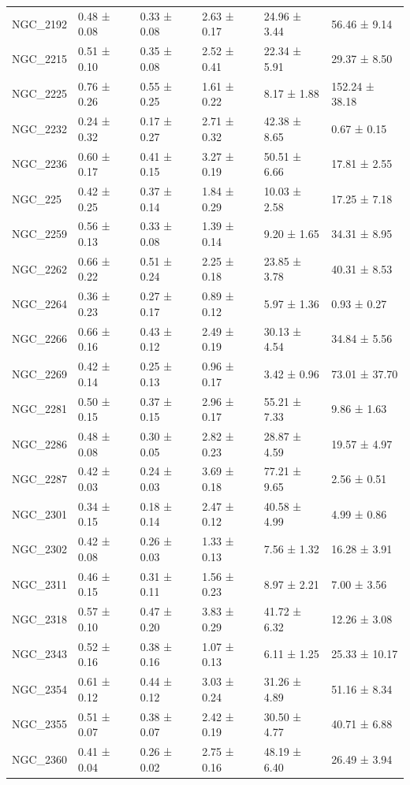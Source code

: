 \begin{tabular}{llllll}
NGC_2192 & 0.48 ± 0.08 & 0.33 ± 0.08 & 2.63 ± 0.17 & 24.96 ± 3.44 & 56.46 ± 9.14 \\
NGC_2215 & 0.51 ± 0.10 & 0.35 ± 0.08 & 2.52 ± 0.41 & 22.34 ± 5.91 & 29.37 ± 8.50 \\
NGC_2225 & 0.76 ± 0.26 & 0.55 ± 0.25 & 1.61 ± 0.22 & 8.17 ± 1.88 & 152.24 ± 38.18 \\
NGC_2232 & 0.24 ± 0.32 & 0.17 ± 0.27 & 2.71 ± 0.32 & 42.38 ± 8.65 & 0.67 ± 0.15 \\
NGC_2236 & 0.60 ± 0.17 & 0.41 ± 0.15 & 3.27 ± 0.19 & 50.51 ± 6.66 & 17.81 ± 2.55 \\
NGC_225 & 0.42 ± 0.25 & 0.37 ± 0.14 & 1.84 ± 0.29 & 10.03 ± 2.58 & 17.25 ± 7.18 \\
NGC_2259 & 0.56 ± 0.13 & 0.33 ± 0.08 & 1.39 ± 0.14 & 9.20 ± 1.65 & 34.31 ± 8.95 \\
NGC_2262 & 0.66 ± 0.22 & 0.51 ± 0.24 & 2.25 ± 0.18 & 23.85 ± 3.78 & 40.31 ± 8.53 \\
NGC_2264 & 0.36 ± 0.23 & 0.27 ± 0.17 & 0.89 ± 0.12 & 5.97 ± 1.36 & 0.93 ± 0.27 \\
NGC_2266 & 0.66 ± 0.16 & 0.43 ± 0.12 & 2.49 ± 0.19 & 30.13 ± 4.54 & 34.84 ± 5.56 \\
NGC_2269 & 0.42 ± 0.14 & 0.25 ± 0.13 & 0.96 ± 0.17 & 3.42 ± 0.96 & 73.01 ± 37.70 \\
NGC_2281 & 0.50 ± 0.15 & 0.37 ± 0.15 & 2.96 ± 0.17 & 55.21 ± 7.33 & 9.86 ± 1.63 \\
NGC_2286 & 0.48 ± 0.08 & 0.30 ± 0.05 & 2.82 ± 0.23 & 28.87 ± 4.59 & 19.57 ± 4.97 \\
NGC_2287 & 0.42 ± 0.03 & 0.24 ± 0.03 & 3.69 ± 0.18 & 77.21 ± 9.65 & 2.56 ± 0.51 \\
NGC_2301 & 0.34 ± 0.15 & 0.18 ± 0.14 & 2.47 ± 0.12 & 40.58 ± 4.99 & 4.99 ± 0.86 \\
NGC_2302 & 0.42 ± 0.08 & 0.26 ± 0.03 & 1.33 ± 0.13 & 7.56 ± 1.32 & 16.28 ± 3.91 \\
NGC_2311 & 0.46 ± 0.15 & 0.31 ± 0.11 & 1.56 ± 0.23 & 8.97 ± 2.21 & 7.00 ± 3.56 \\
NGC_2318 & 0.57 ± 0.10 & 0.47 ± 0.20 & 3.83 ± 0.29 & 41.72 ± 6.32 & 12.26 ± 3.08 \\
NGC_2343 & 0.52 ± 0.16 & 0.38 ± 0.16 & 1.07 ± 0.13 & 6.11 ± 1.25 & 25.33 ± 10.17 \\
NGC_2354 & 0.61 ± 0.12 & 0.44 ± 0.12 & 3.03 ± 0.24 & 31.26 ± 4.89 & 51.16 ± 8.34 \\
NGC_2355 & 0.51 ± 0.07 & 0.38 ± 0.07 & 2.42 ± 0.19 & 30.50 ± 4.77 & 40.71 ± 6.88 \\
NGC_2360 & 0.41 ± 0.04 & 0.26 ± 0.02 & 2.75 ± 0.16 & 48.19 ± 6.40 & 26.49 ± 3.94 \\

\end{tabular}

